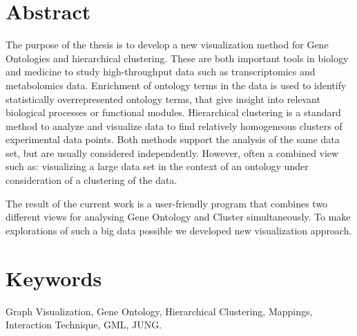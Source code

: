 \section*{Abstract}

The purpose of the thesis is to develop a new visualization method for Gene Ontologies and hierarchical clustering.
These are both important tools in biology and medicine to study high-throughput data such as transcriptomics and metabolomics data.
Enrichment of ontology terms in the data is used to identify statistically overrepresented ontology terms,
that give insight into relevant biological processes or functional modules.
Hierarchical clustering is a standard method to analyze and visualize data to find relatively homogeneous clusters of experimental data points.
Both methods support the analysis of the same data set, but are usually considered independently.
However, often a combined view such as: visualizing a large data set in the context of an ontology under consideration of a clustering of the data.


The result of the current work is a user-friendly program that combines two different views for analysing Gene Ontology and
Cluster simultaneously. To make explorations of such a big data possible we developed new visualization approach.

\section*{Keywords}
\label{sec:keywords}

Graph Visualization, Gene Ontology, Hierarchical Clustering, Mappings, Interaction Technique, GML, JUNG.